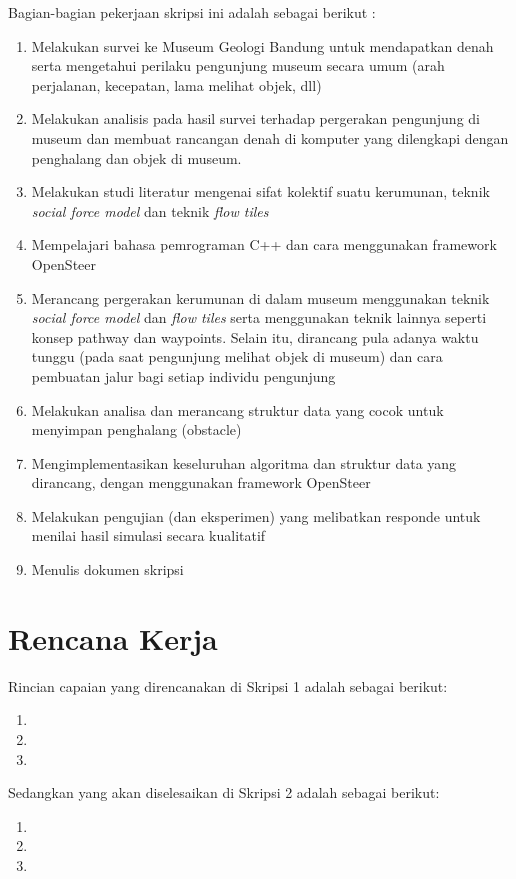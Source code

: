 \documentclass[a4paper,twoside]{article}
\begin{document}
Bagian-bagian pekerjaan skripsi ini adalah sebagai berikut :
	\begin{enumerate}
		\item Melakukan survei ke Museum Geologi Bandung untuk mendapatkan denah serta mengetahui perilaku pengunjung museum secara umum (arah perjalanan, kecepatan, lama melihat objek, dll)
		\item Melakukan analisis pada hasil survei terhadap pergerakan pengunjung di museum dan membuat rancangan denah di komputer yang dilengkapi dengan penghalang dan objek di museum.
		\item Melakukan studi literatur mengenai sifat kolektif suatu kerumunan, teknik {\it social force model} dan teknik {\it flow tiles}
		\item Mempelajari bahasa pemrograman C++ dan cara menggunakan framework OpenSteer
		\item Merancang pergerakan kerumunan di dalam museum menggunakan teknik {\it social force model} dan {\it flow tiles} serta menggunakan teknik lainnya seperti konsep pathway dan waypoints. Selain itu, dirancang pula adanya waktu tunggu (pada saat pengunjung melihat objek di museum) dan cara pembuatan jalur bagi setiap individu pengunjung
		\item Melakukan analisa dan merancang struktur data yang cocok untuk menyimpan penghalang (obstacle)
		\item Mengimplementasikan keseluruhan algoritma dan struktur data yang dirancang, dengan menggunakan framework OpenSteer 
		\item Melakukan pengujian (dan eksperimen) yang melibatkan responde untuk menilai hasil simulasi secara kualitatif
		\item Menulis dokumen skripsi
	\end{enumerate}

\section{Rencana Kerja}
Rincian capaian yang direncanakan di Skripsi 1 adalah sebagai berikut:
\begin{enumerate}
\item
\item
\item
\end{enumerate}

Sedangkan yang akan diselesaikan di Skripsi 2 adalah sebagai berikut:
\begin{enumerate}
\item
\item
\item
\end{enumerate}
\end{document}
